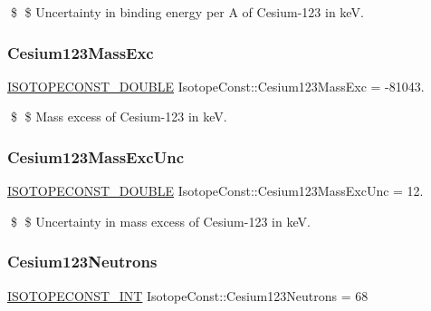 \$ \$ Uncertainty in binding energy per A of Cesium-\/123 in keV. \mbox{\label{group___isotope_const-_cesium-_cs123_ga5b6768e70373a91c0fd70691891256fd}} 
\subsubsection{\texorpdfstring{Cesium123\+Mass\+Exc}{Cesium123MassExc}}
{\footnotesize\ttfamily \mbox{\hyperlink{group___isotope_const-_macros_ga8f45a7272ce02c0b4c65c44636ed719a}{I\+S\+O\+T\+O\+P\+E\+C\+O\+N\+S\+T\+\_\+\+D\+O\+U\+B\+LE}} Isotope\+Const\+::\+Cesium123\+Mass\+Exc = -\/81043.}

\$ \$ Mass excess of Cesium-\/123 in keV. \mbox{\label{group___isotope_const-_cesium-_cs123_ga26318e9d3fc47c1c1b462ff3b8900d22}} 
\subsubsection{\texorpdfstring{Cesium123\+Mass\+Exc\+Unc}{Cesium123MassExcUnc}}
{\footnotesize\ttfamily \mbox{\hyperlink{group___isotope_const-_macros_ga8f45a7272ce02c0b4c65c44636ed719a}{I\+S\+O\+T\+O\+P\+E\+C\+O\+N\+S\+T\+\_\+\+D\+O\+U\+B\+LE}} Isotope\+Const\+::\+Cesium123\+Mass\+Exc\+Unc = 12.}

\$ \$ Uncertainty in mass excess of Cesium-\/123 in keV. \mbox{\label{group___isotope_const-_cesium-_cs123_gaf4b1cdeac5283171ee23eb6342d47bad}} 
\subsubsection{\texorpdfstring{Cesium123\+Neutrons}{Cesium123Neutrons}}
{\footnotesize\ttfamily \mbox{\hyperlink{group___isotope_const-_macros_ga5f18360b3e99483a35c32d789e62621c}{I\+S\+O\+T\+O\+P\+E\+C\+O\+N\+S\+T\+\_\+\+I\+NT}} Isotope\+Const\+::\+Cesium123\+Neutrons = 68}

